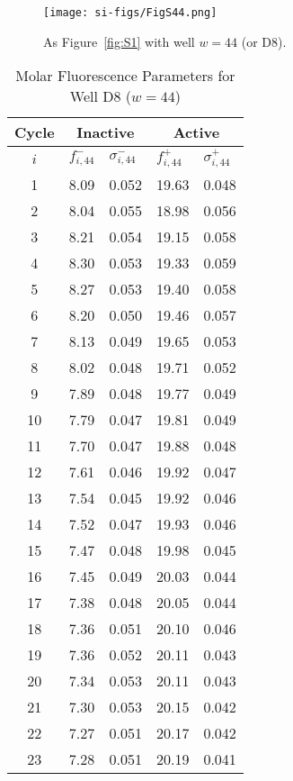                 \begin{figure}
                    \centering
                    \texttt{[image: si-figs/FigS44.png]}
                    \caption{
                        As Figure~\ref{fig:S1} with well $w=44$ (or D8).
                    }
                \end{figure}
                \clearpage
    \begin{table}
        \caption{Molar Fluorescence Parameters for Well D8 ($w=44$)}
        \centering
        \begin{tabular}{c|ll|ll}
            Cycle & \multicolumn{2}{c|}{Inactive} & \multicolumn{2}{c}{Active} \\
            \hline
            $i$ & $f_{i,44}^{-}$ & $\sigma_{i,44}^{-}$ &  $f_{i,44}^{+}$ & $\sigma_{i,44}^{+}$ \\
            \hline
    1 & 8.09 & 0.052 & 19.63 & 0.048 \\
2 & 8.04 & 0.055 & 18.98 & 0.056 \\
3 & 8.21 & 0.054 & 19.15 & 0.058 \\
4 & 8.30 & 0.053 & 19.33 & 0.059 \\
5 & 8.27 & 0.053 & 19.40 & 0.058 \\
6 & 8.20 & 0.050 & 19.46 & 0.057 \\
7 & 8.13 & 0.049 & 19.65 & 0.053 \\
8 & 8.02 & 0.048 & 19.71 & 0.052 \\
9 & 7.89 & 0.048 & 19.77 & 0.049 \\
10 & 7.79 & 0.047 & 19.81 & 0.049 \\
11 & 7.70 & 0.047 & 19.88 & 0.048 \\
12 & 7.61 & 0.046 & 19.92 & 0.047 \\
13 & 7.54 & 0.045 & 19.92 & 0.046 \\
14 & 7.52 & 0.047 & 19.93 & 0.046 \\
15 & 7.47 & 0.048 & 19.98 & 0.045 \\
16 & 7.45 & 0.049 & 20.03 & 0.044 \\
17 & 7.38 & 0.048 & 20.05 & 0.044 \\
18 & 7.36 & 0.051 & 20.10 & 0.046 \\
19 & 7.36 & 0.052 & 20.11 & 0.043 \\
20 & 7.34 & 0.053 & 20.11 & 0.043 \\
21 & 7.30 & 0.053 & 20.15 & 0.042 \\
22 & 7.27 & 0.051 & 20.17 & 0.042 \\
23 & 7.28 & 0.051 & 20.19 & 0.041 \\

\end{tabular}
\end{table}
